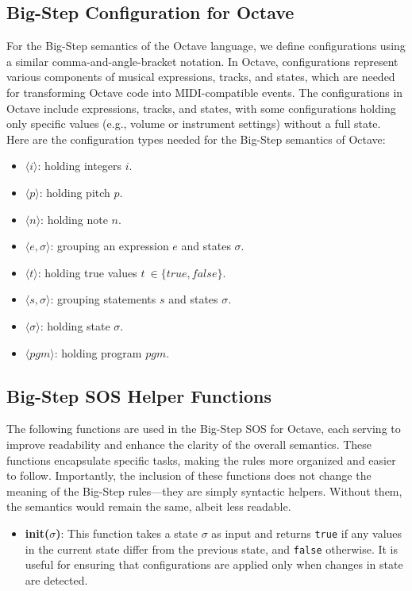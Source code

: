 \documentclass[letterpaper,12pt]{article}
\begin{document}
\subsection{Big-Step Configuration for Octave}
For the Big-Step semantics of the Octave language, we define configurations using a similar comma-and-angle-bracket notation. In Octave, configurations represent various components of musical expressions, tracks, and states, which are needed for transforming Octave code into MIDI-compatible events. The configurations in Octave include expressions, tracks, and states, with some configurations holding only specific values (e.g., volume or instrument settings) without a full state. Here are the configuration types needed for the Big-Step semantics of Octave:

\begin{itemize}    
    \item $\langle i \rangle$: holding integers $i$.
    
    \item $\langle p \rangle$: holding pitch $p$.

    \item $\langle n \rangle$: holding note $n$. 

    \item $\langle e, \sigma \rangle$: grouping an expression $e$ and states $\sigma$. 

    \item $\langle t \rangle$: holding true values $t\ \in \{true, false\}$.
    
    \item $\langle s, \sigma \rangle$: grouping statements $s$ and states $\sigma$. 
        
    \item $\langle \sigma \rangle$: holding state $\sigma$.

    \item $\langle pgm \rangle$: holding program $pgm$.
\end{itemize}

\subsection{Big-Step SOS Helper Functions}

The following functions are used in the Big-Step SOS for Octave, each serving to improve readability and enhance the clarity of the overall semantics. These functions encapsulate specific tasks, making the rules more organized and easier to follow. Importantly, the inclusion of these functions does not change the meaning of the Big-Step rules—they are simply syntactic helpers. Without them, the semantics would remain the same, albeit less readable.
\begin{itemize}
    \item \textbf{init($\sigma$)}: This function takes a state $\sigma$ as input and returns \texttt{true} if any values in the current state differ from the previous state, and \texttt{false} otherwise. It is useful for ensuring that configurations are applied only when changes in state are detected.

\end{itemize}
\end{document}
